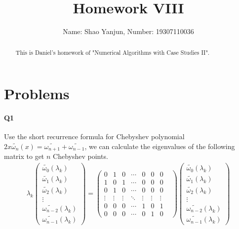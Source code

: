 \documentclass[11pt]{article}
\title{Homework VIII}
\author{Name: Shao Yanjun, Number: 19307110036}
\begin{document}
\maketitle

\begin{abstract}
This is Daniel's homework of  "Numerical Algorithms with Case Studies II".
\end{abstract}
\section{Problems}
\paragraph{Q1}
Use the short recurrence formula for Chebyshev polynomial $2x\tilde{\omega_n}(x)=\tilde{\omega_{n+1}}+\tilde{\omega_{n-1}}$, we can calculate the eigenvalues of the following matrix to get $n$ Chebyshev points.
\begin{align}
	\lambda_k
	\begin{pmatrix}
		\tilde{\omega_0}(\lambda_k)\\
		\tilde{\omega_1}(\lambda_k)\\
		\tilde{\omega_2}(\lambda_k)\\
		\vdots\\
		\tilde{\omega_{n-2}}(\lambda_k)\\
		\tilde{\omega_{n-1}}(\lambda_k)
	\end{pmatrix}
=
	\begin{pmatrix}
		0 & 1 & 0 & \cdots &0 &0 &0\\
		1 & 0 & 1 & \cdots &0 &0 &0\\
		0 & 1 & 0 & \cdots &0 &0 &0\\
		\vdots & \vdots &\vdots &\ddots &\vdots & \vdots &\vdots\\
		0 &0 &0 &\cdots & 1 & 0 & 1\\
		0 &0 &0 &\cdots & 0 & 1 & 0&
	\end{pmatrix}
	\begin{pmatrix}
		\tilde{\omega_0}(\lambda_k)\\
		\tilde{\omega_1}(\lambda_k)\\
		\tilde{\omega_2}(\lambda_k)\\
		\vdots\\
		\tilde{\omega_{n-2}}(\lambda_k)\\
		\tilde{\omega_{n-1}}(\lambda_k)
	\end{pmatrix}
\end{align}
\end{document}
